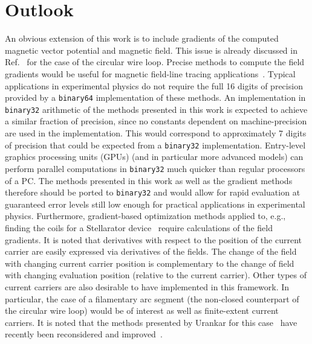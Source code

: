 \section{Outlook}
\label{sec:outlook}
An obvious extension of this work is to include gradients
of the computed magnetic vector potential and magnetic field.
This issue is already discussed in Ref.~\cite{walstrom_2017}
for the case of the circular wire loop.
%
Precise methods to compute the field gradients would be useful for magnetic field-line tracing applications~\cite{bozhenkov_2013}.
Typical applications in experimental physics do not require the full 16 digits of precision
provided by a \texttt{binary64} implementation of these methods.
An implementation in \texttt{binary32} arithmetic
of the methods presented in this work
is expected to achieve a similar fraction of precision,
since no constants dependent on machine-precision are used in the implementation.
This would correspond to approximately 7 digits of precision
that could be expected from a \texttt{binary32} implementation.
Entry-level graphics processing units (GPUs) (and in particular more advanced models)
can perform parallel computations in \texttt{binary32} much quicker than regular processors of a PC.
The methods presented in this work as well as the gradient methods therefore should be ported to \texttt{binary32}
and would allow for rapid evaluation at guaranteed error levels still low enough for practical applications in experimental physics.
%
Furthermore, gradient-based optimization methods applied to, e.g., finding the coils for a Stellarator device~\cite{zhu_2017}
require calculations of the field gradients.
It is noted that derivatives with respect to the position of the current carrier
are easily expressed via derivatives of the fields.
The change of the field with changing current carrier position is complementary
to the change of field with changing evaluation position (relative to the current carrier).
%
Other types of current carriers are also desirable to have implemented in this framework.
In particular, the case of a filamentary arc segment (the non-closed counterpart of the circular wire loop)
would be of interest as well as finite-extent current carriers.
It is noted that the methods presented by Urankar for this case~\cite{urankar_1,urankar_2,urankar_3,urankar_4,urankar_5}
have recently been reconsidered and improved~\cite{maurer_2020}.
